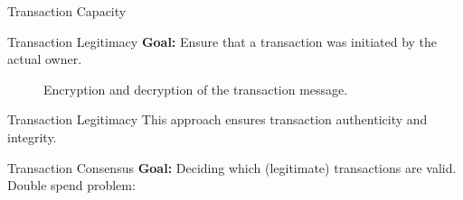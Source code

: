 \documentclass[]{beamer}
\begin{document}
\begin{frame}{Transaction Capacity}  %
	
	\begin{figure}[h!]
		\center
		
	\end{figure}\vspace{1em}

\end{frame}

\begin{frame}{Transaction Legitimacy}
\textbf{Goal:} Ensure that a transaction was initiated by the actual owner.\\ \vspace{1em}

	\begin{figure}[h!]
		\center
		
		\caption{Encryption and decryption of the transaction message.}
		\label{fig:asymmeinfach}
	\end{figure}
\end{frame}

\begin{frame}{Transaction Legitimacy}
	\vspace{1em}
This approach ensures transaction \color{focus}authenticity \color{black}and \color{focus}integrity\color{black}.
	\vspace{1em}
\uncover<1->{
	\begin{figure}[h!]
		\center
		
	\end{figure}
	}
\end{frame}

\begin{frame}{Transaction Consensus}
\textbf{Goal: }Deciding which (legitimate) transactions are valid. \\
\vspace{1em}
Double spend problem: \\
\begin{figure}[h!]
	\center
	
\end{figure}
\end{frame}
\end{document}
